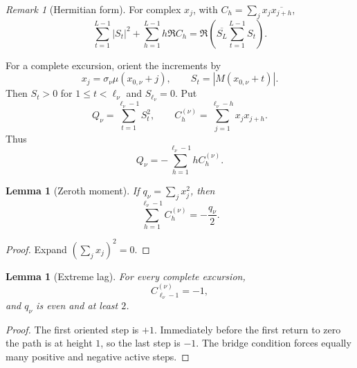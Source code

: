 \documentclass[11pt]{amsart}
\numberwithin{equation}{section}
\theoremstyle{plain}
\newtheorem{lemma}[theorem]{Lemma}
\theoremstyle{definition}
\theoremstyle{remark}
\newtheorem{remark}[theorem]{Remark}
\begin{document}
\begin{remark}[Hermitian form]
\label{rem:hermitian}
For complex $x_j$, with $C_h=\sum_jx_j\overline{x_{j+h}}$,
\[
\sum_{t=1}^{L-1}|S_t|^2+\sum_{h=1}^{L-1}h\Re C_h
=\Re\!\left(\overline{S_L}\sum_{t=1}^{L-1}S_t\right).
\]
\end{remark}

For a complete excursion, orient the increments by
\begin{equation}
\label{eq:orientation}
x_j=\sigma_\nu\mu(x_{0,\nu}+j),\qquad
S_t=|M(x_{0,\nu}+t)|.
\end{equation}
Then $S_t>0$ for $1\le t<\ell_\nu$ and $S_{\ell_\nu}=0$. Put
\begin{equation}
\label{eq:Q_def}
Q_\nu=\sum_{t=1}^{\ell_\nu-1}S_t^2,\qquad
C_h^{(\nu)}=\sum_{j=1}^{\ell_\nu-h}x_jx_{j+h}.
\end{equation}
Thus
\begin{equation}
\label{eq:Qcorr}
Q_\nu=-\sum_{h=1}^{\ell_\nu-1}hC_h^{(\nu)}.
\end{equation}

\begin{lemma}[Zeroth moment]
\label{lem:zeroth-corr}
If $q_\nu=\sum_jx_j^2$, then
\begin{equation}
\label{eq:zeroth-corr}
\sum_{h=1}^{\ell_\nu-1}C_h^{(\nu)}=-\frac{q_\nu}{2}.
\end{equation}
\end{lemma}

\begin{proof}
Expand $(\sum_jx_j)^2=0$.
\end{proof}

\begin{lemma}[Extreme lag]
\label{lem:extreme-lag}
For every complete excursion,
\[
C_{\ell_\nu-1}^{(\nu)}=-1,
\]
and $q_\nu$ is even and at least $2$.
\end{lemma}

\begin{proof}
The first oriented step is $+1$.  Immediately before the first return to
zero the path is at height $1$, so the last step is $-1$.  The bridge
condition forces equally many positive and negative active steps.
\end{proof}
\end{document}
